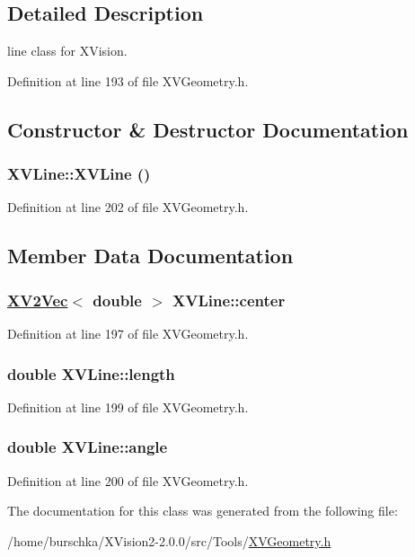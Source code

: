 \subsection{Detailed Description}
line class for XVision.





Definition at line 193 of file XVGeometry.h.

\subsection{Constructor \& Destructor Documentation}
\label{XVLine_a0}
\hypertarget{class_XVLine_a0}{
\subsubsection[XVLine]{\setlength{\rightskip}{0pt plus 5cm}XVLine::XVLine ()}}




Definition at line 202 of file XVGeometry.h.

\subsection{Member Data Documentation}
\label{XVLine_m0}
\hypertarget{class_XVLine_m0}{
\subsubsection[center]{\setlength{\rightskip}{0pt plus 5cm}\hyperlink{class_XV2Vec}{XV2Vec}$<$ double $>$ XVLine::center}}




Definition at line 197 of file XVGeometry.h.\label{XVLine_m1}
\hypertarget{class_XVLine_m1}{
\subsubsection[length]{\setlength{\rightskip}{0pt plus 5cm}double XVLine::length}}




Definition at line 199 of file XVGeometry.h.\label{XVLine_m2}
\hypertarget{class_XVLine_m2}{
\subsubsection[angle]{\setlength{\rightskip}{0pt plus 5cm}double XVLine::angle}}




Definition at line 200 of file XVGeometry.h.

The documentation for this class was generated from the following file:\begin{CompactItemize}
\item 
/home/burschka/XVision2-2.0.0/src/Tools/\hyperlink{XVGeometry.h-source}{XVGeometry.h}\end{CompactItemize}
